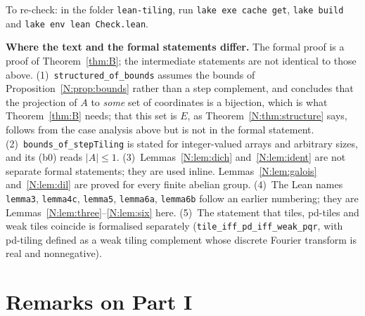 \documentclass[11pt,a4paper]{amsart}
\theoremstyle{definition}
\theoremstyle{remark}
\newcommand{\lean}[1]{\texttt{#1}}
\begin{document}
\medskip
\noindent To re-check: in the folder \texttt{lean-tiling}, run \texttt{lake exe cache get}, \texttt{lake build}
and \texttt{lake env lean Check.lean}.

\medskip
{\sloppy\noindent\textbf{Where the text and the formal statements differ.} The formal proof is a proof of
Theorem~\ref{thm:B}; the intermediate statements are not identical to those above.
(1)~\lean{structured\_of\_bounds} assumes the bounds of Proposition~\ref{N:prop:bounds} rather than a step
complement, and concludes that the projection of $A$ to \emph{some} set of coordinates is a bijection, which is
what Theorem~\ref{thm:B} needs; that this set is $E$, as Theorem~\ref{N:thm:structure} says, follows from the
case analysis above but is not in the formal statement.
(2)~\lean{bounds\_of\_stepTiling} is stated for integer-valued arrays and arbitrary sizes, and its (b0) reads
$|A|\le 1$.
(3)~Lemmas~\ref{N:lem:dich} and~\ref{N:lem:ident} are not separate formal statements; they are used inline.
Lemmas~\ref{N:lem:galois} and~\ref{N:lem:dil} are proved for every finite abelian group.
(4)~The Lean names \lean{lemma3}, \lean{lemma4c}, \lean{lemma5}, \lean{lemma6a}, \lean{lemma6b} follow an earlier
numbering; they are Lemmas~\ref{N:lem:three}--\ref{N:lem:six} here.
(5)~The statement that tiles, pd-tiles and weak tiles coincide is formalised separately
(\lean{tile\_iff\_pd\_iff\_weak\_pqr}, with pd-tiling defined as a weak tiling complement whose discrete Fourier
transform is real and nonnegative).\par}

\section{Remarks on Part I}
\end{document}
